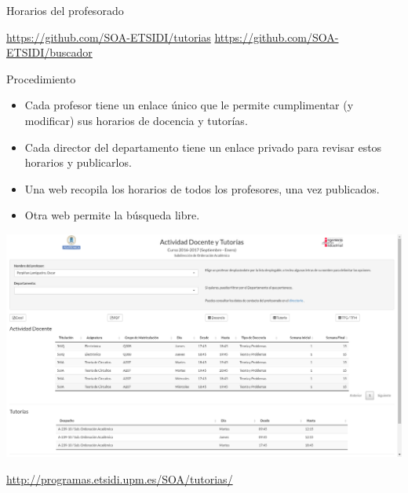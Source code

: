 \documentclass[spanish, xcolor={usenames,svgnames,dvipsnames}]{beamer}
\begin{document}
\begin{frame}[label={sec:org2078c63}]{Horarios del profesorado}
\begin{block}{}
\url{https://github.com/SOA-ETSIDI/tutorias}
\url{https://github.com/SOA-ETSIDI/buscador}
\end{block}

\begin{block}{Procedimiento}
\begin{itemize}
\item Cada profesor tiene un enlace único que le permite cumplimentar (y modificar) sus horarios de docencia y tutorías.
\item Cada director del departamento tiene un enlace privado para revisar estos horarios y publicarlos.
\item Una web recopila los horarios de todos los profesores, una vez publicados.
\item Otra web permite la búsqueda libre.
\end{itemize}
\end{block}
\end{frame}

\begin{frame}[label={sec:org644e12e}]{}
\begin{center}
\includegraphics[width=.9\linewidth]{images/tutorias.png}
\end{center}

\url{http://programas.etsidi.upm.es/SOA/tutorias/}
\end{frame}
\end{document}
